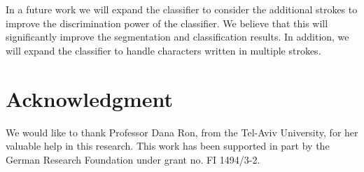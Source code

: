 \documentclass[10pt, conference, compsocconf]{IEEEtran}
\begin{document}
In a future work we will expand the classifier to consider the additional strokes to improve the discrimination power of the classifier. 
We believe that this will significantly improve the segmentation and classification results.
In addition, we will expand the classifier to handle characters written in multiple strokes.

\section*{Acknowledgment}
We would like to thank Professor Dana Ron, from the Tel-Aviv University, for her valuable help in this research. 
This work has been supported in part by the German Research Foundation under grant no. FI 1494/3-2.




\end{document}
